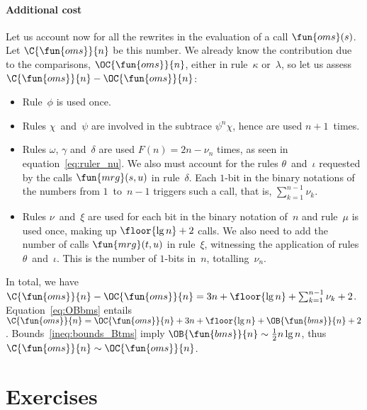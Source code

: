 \paragraph{Additional cost}

Let us account now for all the rewrites in the evaluation of a call
\(\fun{oms}(s)\). Let
\(\C{\fun{oms}}{n}\) be this number. We
already know the contribution due to the comparisons,
\(\OC{\fun{oms}}{n}\), either in
rule~\(\kappa\) or~\(\lambda\), so let us assess \(\C{\fun{oms}}{n} -
\OC{\fun{oms}}{n}\):
\begin{itemize}

  \item Rule~\(\phi\) is used once.

  \item Rules \(\chi\)~and~\(\psi\) are involved in the subtrace
    \(\psi^n\chi\), hence are used \(n+1\)~times.

  \item Rules \(\omega\), \(\gamma\) and~\(\delta\) are used \(F(n) =
    2n - \nu_n\) times, as seen in equation~\eqref{eq:ruler_nu}. We
    also must account for the rules \(\theta\)~and~\(\iota\) requested
    by the calls \(\fun{mrg}(s,u)\) in rule~\(\delta\). Each \(1\)-bit
    in the binary notations of the numbers from \(1\)~to~\(n-1\)
    triggers such a call, that is, \(\sum_{k=1}^{n-1}\nu_k\).

  \item Rules \(\nu\)~and~\(\xi\) are used for each bit in the binary
    notation of~\(n\) and rule~\(\mu\) is used once, making up
    \(\floor{\lg n} + 2\) calls. We also need to add the number of
    calls \(\fun{mrg}(t,u)\) in rule~\(\xi\),
    witnessing the application of rules \(\theta\)~and~\(\iota\). This
    is the number of \(1\)-bits in~\(n\), totalling~\(\nu_n\).

\end{itemize}
In total, we have \(\C{\fun{oms}}{n} - \OC{\fun{oms}}{n} = 3n +
\floor{\lg n} + \sum_{k=1}^{n-1}\nu_k + 2\). Equation~\eqref{eq:OBbms}
 entails \(\C{\fun{oms}}{n} = \OC{\fun{oms}}{n} +
3n + \floor{\lg n} + \OB{\fun{bms}}{n} +
2\). Bounds~\eqref{ineq:bounds_Btms}  imply
\(\OB{\fun{bms}}{n} \sim \tfrac{1}{2}n\lg n\), thus \(\C{\fun{oms}}{n}
\sim \OC{\fun{oms}}{n}\).   

\section*{Exercises}

